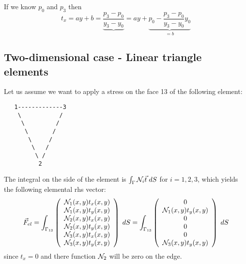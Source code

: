 If we know $p_0$ and $p_3$ then 
\[
t_x=ay+b = \underbrace{\frac{p_3-p_0}{y_3-y_0}}{=a} y + \underbrace{p_0-\frac{p_3-p_0}{y_3-y_0} y_0}_{=b}
\]












\subsection{Two-dimensional case - Linear triangle elements}

Let us assume we want to apply a stress on the face 13 of the following element:
\begin{verbatim}
   1-------------3
    \           /
     \         /
      \       /
       \     /
        \   /
         \ /
          2
\end{verbatim}

The integral on the side of the element is $\int_\Gamma {\mathcal{N}}_i {\vec t} \; dS$
for $i=1,2,3$, which yields the following elemental rhs vector:
\[
\vec{F}_{el}=
\int_{\Gamma_{13}} 
\left(
\begin{array}{c}
{\mathcal{N}}_1(x,y) t_x(x,y)\\
{\mathcal{N}}_1(x,y) t_y(x,y)\\
{\mathcal{N}}_2(x,y) t_x(x,y)\\
{\mathcal{N}}_2(x,y) t_y(x,y)\\
{\mathcal{N}}_3(x,y) t_x(x,y)\\
{\mathcal{N}}_3(x,y) t_y(x,y)
\end{array}
\right)
\; dS
=
\int_{\Gamma_{13}} 
\left(
\begin{array}{c}
0\\
{\mathcal{N}}_1(x,y) t_y(x,y)\\
0\\
0\\
0\\
{\mathcal{N}}_3(x,y) t_y(x,y)
\end{array}
\right)
\; dS
\]
since $t_x=0$ and there function ${\mathcal{N}}_2$ will be zero on the edge.

